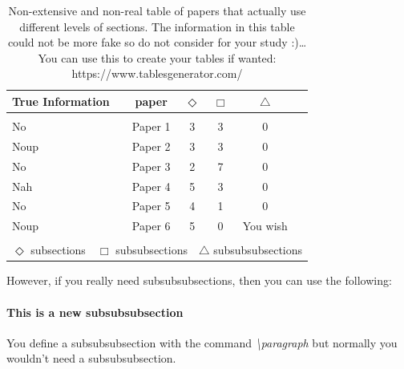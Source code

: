 \begin{table}
\begin{center}
\begin{tabular}{lccccc}
\hline
\rule{0pt}{12pt}
True Information&paper&$\Diamond$&$\Box$&$\bigtriangleup$ 
\\ 
\hline
\\[-6pt]
No & Paper 1 & 3 & 3 & 0 \\ 
Noup & Paper 2 & 3 & 3 & 0 \\ 
No & Paper 3 & 2 & 7 & 0 \\ 
Nah & Paper 4 & 5 & 3 & 0 \\ 
No & Paper 5 & 4 & 1 & 0 \\ 
Noup & Paper 6 & 5 & 0 & You wish \\ 
\hline
\\[-6pt]
\multicolumn{6}{l}{$\Diamond$ subsections\ \
$\Box$ subsubsections\ \
$\bigtriangleup$ subsubsubsections}
\end{tabular}
{\caption{Non-extensive and non-real table of papers that actually use different levels of sections. The information in this table could not be more fake so do not consider for your study :)\dots{} You can use this to create your tables if wanted: https://www.tablesgenerator.com/}\label{table:sectionKnowledge}}
\end{center}
\end{table}

However, if you really need subsubsubsections, then you can use the following:

\paragraph{This is a new subsubsubsection}
You define a subsubsubsection with the command \textit{\textbackslash paragraph} but normally you wouldn't need a subsubsubsection. 

\blindtext
\blindtext